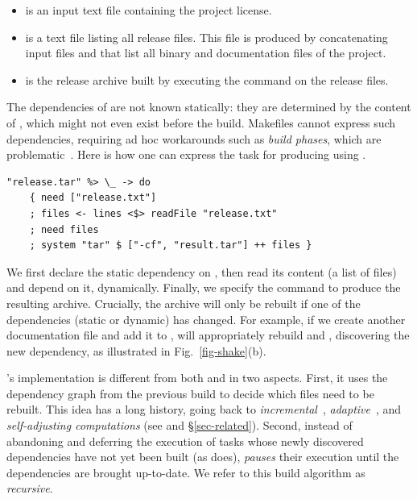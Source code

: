 \begin{itemize}
    \item {} is an input text file containing the project license.
    \item {} is a text file listing all release files. This file
    is produced by concatenating input files  and 
    that list all binary and documentation files of the project.
    \item {} is the release archive built by executing the
    command  on the release files.
\end{itemize}

The dependencies of  are not known statically: they are
determined by the content of , which might not even exist
before the build. Makefiles cannot express such dependencies, requiring ad hoc
workarounds such as \emph{build phases}, which are problematic~\cite{hadrian}.
Here is how one can express the task for producing  using \Shake.

\vspace{1mm}
\begin{verbatim}
"release.tar" %> \_ -> do
    { need ["release.txt"]
    ; files <- lines <$> readFile "release.txt"
    ; need files
    ; system "tar" $ ["-cf", "result.tar"] ++ files }
\end{verbatim}
\vspace{1mm}

\noindent
We first declare the static dependency on , then read its
content (a list of files) and depend on it, dynamically. Finally, we specify the
command to produce the resulting archive. Crucially, the archive will only be
rebuilt if one of the dependencies (static or dynamic) has changed. For example,
if we create another documentation file  and add it to
, \Shake will appropriately rebuild  and
, discovering the new dependency, as illustrated in
Fig.~\ref{fig-shake}(b).

\Shake's implementation is different from both \Make and \Excel in two aspects.
First, it uses the dependency graph from the previous build to decide which
files need to be rebuilt. This idea has a long history, going back to
\emph{incremental}~\cite{demers1981incremental},
\emph{adaptive}~\cite{acar2002adaptive}, and
\emph{self-adjusting computations} (see \cite{acar2007selfadjusting} and \S\ref{sec-related}).
Second, instead of abandoning
and deferring the execution of tasks whose newly discovered dependencies have
not yet been built (as \Excel does), \Shake \emph{pauses} their execution until
the dependencies are brought up-to-date. We refer to this build algorithm as
\emph{recursive}.

